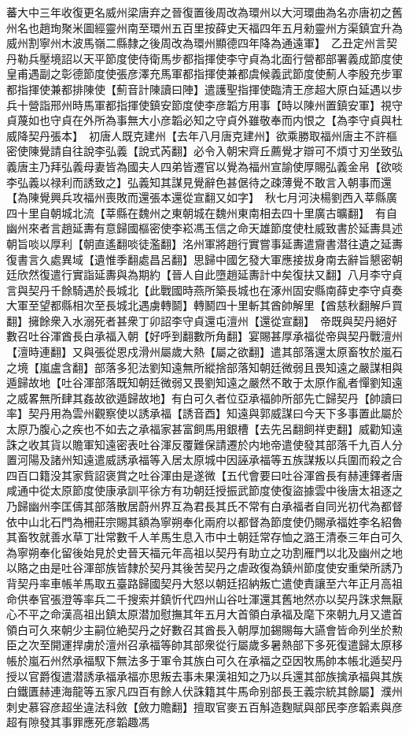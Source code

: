蕃大中三年收復更名威州梁唐弃之晉復置後周改為環州以大河環曲為名亦唐初之舊州名也趙珣聚米圖經靈州南至環州五百里按薛史天福四年五月勑靈州方渠鎮宜升為威州割寧州木波馬嶺二縣隸之後周改為環州顯德四年降為通遠軍】　乙丑定州言契丹勒兵壓境詔以天平節度使侍衛馬步都指揮使李守貞為北面行營都部署義成節度使皇甫遇副之彰德節度使張彦澤充馬軍都指揮使兼都虞候義武節度使薊人李殷充步軍都指揮使兼都排陳使【薊音計陳讀曰陣】遣護聖指揮使臨清王彦超大原白延遇以步兵十營詣邢州時馬軍都指揮使鎮安節度使李彦韜方用事【時以陳州置鎮安軍】視守貞蔑如也守貞在外所為事無大小彦韜必知之守貞外雖敬奉而内恨之【為李守貞與杜威降契丹張本】　初唐人既克建州【去年八月唐克建州】欲乘勝取福州唐主不許樞密使陳覺請自往說李弘義【說式芮翻】必令入朝宋齊丘薦覺才辯可不煩寸刃坐致弘義唐主乃拜弘義母妻皆為國夫人四弟皆遷官以覺為福州宣諭使厚賜弘義金帛【欲啖李弘義以禄利而誘致之】弘義知其謀見覺辭色甚倨待之疎薄覺不敢言入朝事而還【為陳覺興兵攻福州喪敗而還張本還從宣翻又如字】　秋七月河決楊劉西入莘縣廣四十里自朝城北流【莘縣在魏州之東朝城在魏州東南相去四十里廣古曠翻】　有自幽州來者言趙延夀有意歸國樞密使李崧馮玉信之命天雄節度使杜威致書於延夀具述朝旨啖以厚利【朝直遙翻啖徒濫翻】洺州軍將趙行實嘗事延夀遣齎書潜往遺之延夀復書言久處異域【遺惟季翻處昌呂翻】思歸中國乞發大軍應接拔身南去辭旨懇密朝廷欣然復遣行實詣延夀與為期約【晉人自此墮趙延夀計中矣復扶又翻】八月李守貞言與契丹千餘騎遇於長城北【此戰國時燕所築長城也在涿州固安縣南薛史李守貞奏大軍至望都縣相次至長城北遇虜轉鬬】轉鬭四十里斬其酋帥解里【酋慈秋翻解戶買翻】擁餘衆入水溺死者甚衆丁卯詔李守貞還屯澶州【還從宣翻】　帝既與契丹絕好數召吐谷渾酋長白承福入朝【好呼到翻數所角翻】宴賜甚厚承福從帝與契丹戰澶州【澶時連翻】又與張從恩戍滑州屬歲大熱【屬之欲翻】遣其部落還太原畜牧於嵐石之境【嵐盧含翻】部落多犯法劉知遠無所縱捨部落知朝廷微弱且畏知遠之嚴謀相與遁歸故地【吐谷渾部落既知朝廷微弱又畏劉知遠之嚴然不敢于太原作亂者憚劉知遠之威畧無所肆其姦故欲遁歸故地】有白可久者位亞承福帥所部先亡歸契丹【帥讀曰率】契丹用為雲州觀察使以誘承福【誘音酉】知遠與郭威謀曰今天下多事置此屬於太原乃腹心之疾也不如去之承福家甚富飼馬用銀槽【去先呂翻飼祥吏翻】威勸知遠誅之收其貨以贍軍知遠密表吐谷渾反覆難保請遷於内地帝遣使發其部落千九百人分置河陽及諸州知遠遣威誘承福等入居太原城中因誣承福等五族謀叛以兵圍而殺之合四百口籍没其家貲詔褒賞之吐谷渾由是遂微【五代會要曰吐谷渾酋長有赫連鐸者唐咸通中從太原節度使康承訓平徐方有功朝廷授振武節度使復盜據雲中後唐太祖逐之乃歸幽州李匡儔其部落散居蔚州界互為君長其氏不常有白承福者自同光初代為都督依中山北石門為柵莊宗賜其額為寧朔奉化兩府以都督為節度使仍賜承福姓李名紹魯其畜牧就善水草丁壯常數千人羊馬生息入市中土朝廷常存恤之潞王清泰三年白可久為寧朔奉化留後始見於史晉天福元年高祖以契丹有助立之功割雁門以北及幽州之地以賂之由是吐谷渾部族皆隸於契丹其後苦契丹之虐政復為鎮州節度使安重榮所誘乃背契丹率車帳羊馬取五臺路歸國契丹大怒以朝廷招納叛亡遣使責讓至六年正月高祖命供奉官張澄等率兵二千搜索并鎮忻代四州山谷吐渾還其舊地然亦以契丹誅求無厭心不平之命漢高祖出鎮太原潜加慰撫其年五月大首領白承福及麾下來朝九月又遣首領白可久來朝少主嗣位絶契丹之好數召其酋長入朝厚加錫賜每大讌會皆命列坐於勲臣之次至開運捍虜於澶州召承福等帥其部衆從行屬歲多暑熱部下多死復遣歸太原移帳於嵐石州然承福馭下無法多于軍令其族白可久在承福之亞因牧馬帥本帳北遁契丹授以官爵復遣潜誘承福承福亦思叛去事未果漢祖知之乃以兵還其部族擒承福與其族白鐵匱赫連海龍等五家凡四百有餘人伏誅籍其牛馬命别部長王義宗統其餘屬】濮州刺史慕容彦超坐違法科斂【斂力贍翻】擅取官麥五百斛造麴賦與部民李彦韜素與彦超有隙發其事罪應死彦韜趣馮